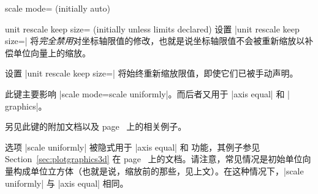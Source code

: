\begin{pgfplotskey}{scale mode= (initially auto)}
\begin{pgfplotskey}{unit rescale keep size= (initially unless limits declared)%
    }
        设置 |unit rescale keep size=| 将\emph{完全禁用}对坐标轴限值的修改，也就是说坐标轴限值不会被重新缩放以补偿单位向量上的缩放。

        设置 |unit rescale keep size=| 将始终重新缩放限值，即使它们已被手动声明。

        此键主要影响 |scale mode=scale uniformly|。而后者又用于 |axis equal| 和 | graphics|。

        另见此键的附加文档以及 page~\pageref{key:unit:rescale:keep:size} 上的相关例子。
    \end{pgfplotskey}

    选项 |scale uniformly| 被隐式用于 |axis equal| 和  功能，其例子参见 Section~\ref{sec:plotgraphics3d} 在 page~\pageref{sec:plotgraphics3d} 上的文档。请注意，常见情况是初始单位向量构成单位立方体（也就是说，缩放前的那些，见上文）。在这种情况下，|scale uniformly| 与 |axis equal| 相同。
\end{pgfplotskey}
